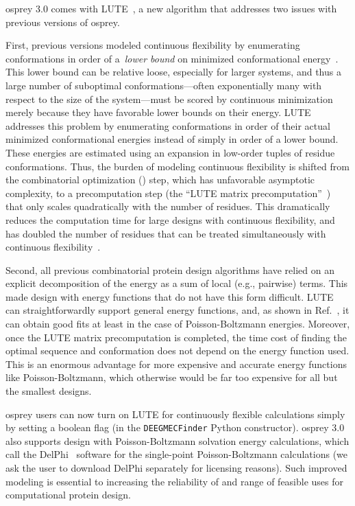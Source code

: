 {\sc osprey} 3.0 comes with LUTE~\cite{LUTE_RECOMB}, a new algorithm that addresses two issues with previous versions of {\sc osprey}.  

First, previous versions modeled continuous flexibility by enumerating conformations in order of a~\textit{lower bound} on minimized conformational energy~\cite{minDEE,iMinDEE}. This lower bound can be relative loose, especially for larger systems, and thus a large number of suboptimal conformations---often exponentially many with respect to the size of the system---must be scored by continuous minimization merely because they have favorable lower bounds on their energy.  LUTE addresses this problem by enumerating conformations in order of their actual minimized conformational energies instead of simply in order of a lower bound.  These energies are estimated using an expansion in low-order tuples of residue conformations.  Thus, the burden of modeling continuous flexibility is shifted from the combinatorial optimization (\as) step, which has unfavorable asymptotic complexity, to a precomputation step (the ``LUTE matrix precomputation''~\cite{LUTE_RECOMB}) that only scales quadratically with the number of residues. This dramatically reduces the computation time for large designs with continuous flexibility, and has doubled the number of residues that can be treated simultaneously with continuous flexibility~\cite{LUTE_RECOMB}.    

Second, all previous combinatorial protein design algorithms have relied on an explicit decomposition of the energy as a sum of local (e.g., pairwise) terms.  This made design with energy functions that do not have this form difficult. LUTE can straightforwardly support general energy functions, and, as shown in Ref.~, it can obtain good fits at least in the case of Poisson-Boltzmann energies.  Moreover, once the LUTE matrix precomputation is completed, the time cost of finding the optimal sequence and conformation does not depend on the energy function used.  This is an enormous advantage for more expensive and accurate energy functions like Poisson-Boltzmann, which otherwise would be far too expensive for all but the smallest designs.  

{\sc osprey} users can now turn on LUTE for continuously flexible calculations simply by setting a boolean flag (in the {\tt DEEGMECFinder} Python constructor). 
{\sc osprey} 3.0 also supports design with Poisson-Boltzmann solvation energy calculations, which call the DelPhi~\cite{OSOR,DelPhi_surface} software for the single-point Poisson-Boltzmann calculations (we ask the user to download DelPhi separately for licensing reasons). Such improved modeling is essential to increasing the reliability of and range of feasible uses for computational protein design.  